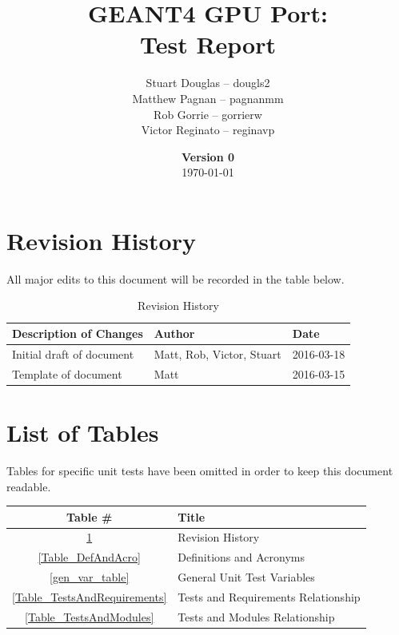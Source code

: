 \documentclass[12pt]{article}
\title{
\LARGE GEANT4 GPU Port:
\\\vspace{10mm}
\large \textbf{Test Report}
\vspace{40mm}
}
\author{
Stuart Douglas -- dougls2
\\Matthew Pagnan -- pagnanmm
\\Rob Gorrie -- gorrierw
\\Victor Reginato -- reginavp
\vspace{10mm}
}
\date{\vfill \textbf{Version 0}\\ \today}
\begin{document}

\maketitle
\newpage

\tableofcontents
\newpage
{}
\restoregeometry

\section*{Revision History}
All major edits to this document will be recorded in the table below.

\begin{table}[h]
\centering
\caption{Revision History}\label{Table_Revision}
\begin{tabular}{lll}
\toprule
\bf Description of Changes & \bf Author & \bf Date\\\midrule
Initial draft of document & Matt, Rob, Victor, Stuart & 2016-03-18\\
Template of document & Matt  & 2016-03-15\\
\bottomrule
\end{tabular}
\end{table}

\section*{List of Tables}
Tables for specific unit tests have been omitted in order to keep this document readable.
\begin{center}
\begin{tabular}{cl}
\toprule
\bf Table \# & \bf Title\\\midrule
\ref{Table_Revision} 			& Revision History\\
\ref{Table_DefAndAcro} 			& Definitions and Acronyms\\
\ref{gen_var_table}			& General Unit Test Variables\\
\ref{Table_TestsAndRequirements}	& Tests and Requirements Relationship\\
\ref{Table_TestsAndModules}		& Tests and Modules Relationship\\
\bottomrule
\end{tabular}
\end{center}
\end{document}
